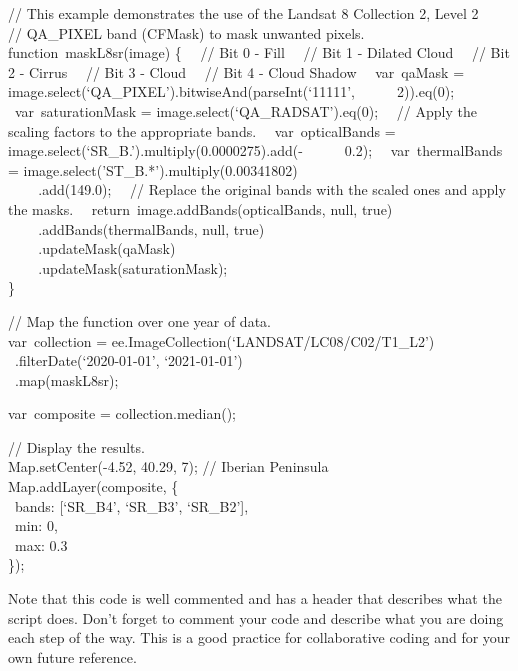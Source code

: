 \documentclass[
  letterpaper,
  DIV=11,
  numbers=noendperiod]{scrreprt}
\begin{document}
// This example demonstrates the use of the Landsat 8 Collection 2,
Level 2\\
// QA\_PIXEL band (CFMask) to mask unwanted pixels.\\
function~maskL8sr(image) \{~ ~// Bit 0 - Fill~ ~// Bit 1 - Dilated
Cloud~ ~// Bit 2 - Cirrus~ ~// Bit 3 - Cloud~ ~// Bit 4 - Cloud Shadow~
~var~qaMask = image.select(`QA\_PIXEL').bitwiseAnd(parseInt(`11111',~ ~
~ ~2)).eq(0);~ ~var~saturationMask = image.select(`QA\_RADSAT').eq(0);~
~// Apply the scaling factors to the appropriate bands.~
~var~opticalBands = image.select(`SR\_B.').multiply(0.0000275).add(-~ ~
~ ~0.2);~ ~var~thermalBands =
image.select('ST\_B.*').multiply(0.00341802)\\
\hspace*{0.333em} ~ ~ ~.add(149.0);~ ~// Replace the original bands with
the scaled ones and apply the masks.~
~return~image.addBands(opticalBands, null, true)\\
\hspace*{0.333em} ~ ~ ~.addBands(thermalBands, null, true)\\
\hspace*{0.333em} ~ ~ ~.updateMask(qaMask)\\
\hspace*{0.333em} ~ ~ ~.updateMask(saturationMask);\\
\}

// Map the function over one year of data.\\
var~collection = ee.ImageCollection(`LANDSAT/LC08/C02/T1\_L2')\\
\hspace*{0.333em} ~.filterDate(`2020-01-01', `2021-01-01')\\
\hspace*{0.333em} ~.map(maskL8sr);

var~composite = collection.median();

// Display the results.\\
Map.setCenter(-4.52, 40.29, 7); // Iberian Peninsula\\
Map.addLayer(composite, \{\\
\hspace*{0.333em} ~bands: {[}`SR\_B4', `SR\_B3', `SR\_B2'{]},\\
\hspace*{0.333em} ~min: 0,\\
\hspace*{0.333em} ~max: 0.3\\
\});

Note that this code is well commented and has a header that describes
what the script does. Don't forget to comment your code and describe
what you are doing each step of the way. This is a good practice for
collaborative coding and for your own future reference.
\end{document}
